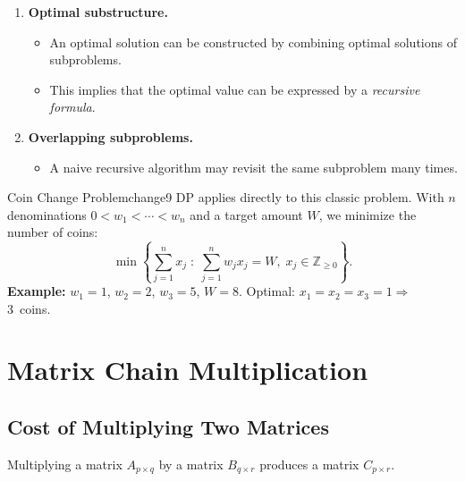 \begin{enumerate}
  \item \textbf{Optimal substructure.}
    \begin{itemize}
      \item An optimal solution can be constructed by combining optimal solutions
            of subproblems.
      \item This implies that the optimal value can be expressed by a
            \emph{recursive formula}.
    \end{itemize}
  \item \textbf{Overlapping subproblems.}
    \begin{itemize}
      \item A naive recursive algorithm may revisit the same subproblem
            many times.
    \end{itemize}
\end{enumerate}

\begin{remark}{Coin Change Problem}{change9}
DP applies directly to this classic problem. With $n$ denominations
$0 < w_1 < \cdots < w_n$ and a target amount $W$, we minimize the number of coins:
\[
  \min\left\{\sum_{j=1}^{n} x_j \;:\; \sum_{j=1}^{n} w_j x_j = W,\; x_j \in \mathbb{Z}_{\ge 0}\right\}.
\]
\textbf{Example:} $w_1=1$, $w_2=2$, $w_3=5$, $W=8$.
Optimal: $x_1 = x_2 = x_3 = 1 \Rightarrow$ 3~coins.
\end{remark}

\section*{Matrix Chain Multiplication}

\subsection{Cost of Multiplying Two Matrices}

Multiplying a matrix $A_{p \times q}$ by a matrix $B_{q \times r}$ produces a
matrix $C_{p \times r}$.

